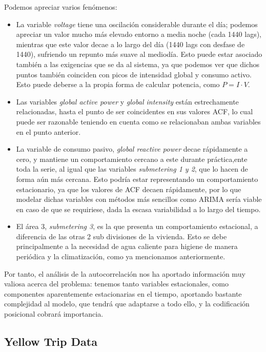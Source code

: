 Podemos apreciar varios fenómenos:
\begin{itemize}
	\item La variable \textit{voltage} tiene una oscilación considerable durante el día; podemos apreciar un valor mucho más elevado entorno a media noche (cada 1440 lags), mientras que este valor decae a lo largo del día (1440 lags con desfase de 1440), sufriendo un repunto más suave al mediodía. Esto puede estar asociado también a las exigencias que se da al sistema, ya que podemos ver que dichos puntos también coinciden con picos de intensidad global y consumo activo. Esto puede deberse a la propia forma de calcular potencia, como $P = I \cdot V$.
	\item Las variables \textit{global active power} y \textit{global intensity} están estrechamente relacionadas, hasta el punto de ser coincidentes en sus valores ACF, lo cual puede ser razonable teniendo en cuenta como se relacionaban ambas variables en el punto anterior.
	\item La variable de consumo pasivo, \textit{global reactive power} decae rápidamente a cero, y mantiene un comportamiento cercano a este durante práctica,ente toda la serie, al igual que las variables \textit{submetering 1 y 2}, que lo hacen de forma aún más cercana. Esto podría estar representando un comportamiento estacionario, ya que los valores de ACF decaen rápidamente, por lo que modelar dichas variables con métodos más sencillos como ARIMA sería viable en caso de que se requiriese, dada la escasa variabilidad a lo largo del tiempo. 
	\item El área 3, \textit{submetering 3}, es la que presenta un comportamiento estacional, a diferencia de las otras 2 sub divisiones de la vivienda. Esto se debe principalmente a la necesidad de agua caliente para higiene de manera periódica y la climatización, como ya mencionamos anteriormente.
\end{itemize}

Por tanto, el análisis de la autocorrelación nos ha aportado información muy valiosa acerca del problema: tenemos tanto variables estacionales, como componentes aparentemente estacionarias en el tiempo, aportando bastante complejidad al modelo, que tendrá que adaptarse a todo ello, y la codificación posicional cobrará importancia.

\subsection{Yellow Trip Data}

